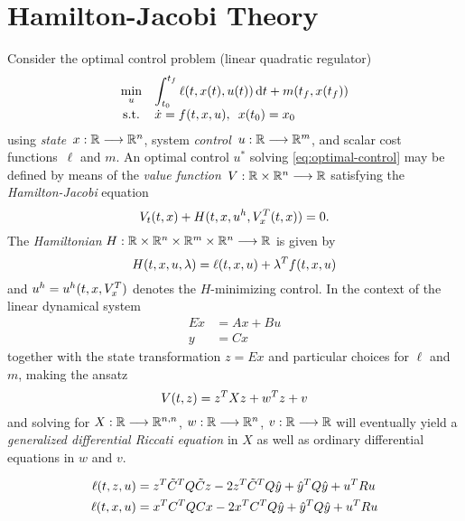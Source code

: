 \cite{DrWatson}

\section{Hamilton-Jacobi Theory}

Consider the optimal control problem
(linear quadratic regulator)
\begin{equation}
  \everymath{\displaystyle}
  \begin{array}{cl}
    \min_u & \int_{t_0}^{t_f} \ell(t, x(t), u(t)) \dt + m(t_f, x(t_f)) \\
    \text{s.t.} & \dot{x} = f(t,x,u), \enspace x(t_0) = x_0
  \end{array}
  \label{eq:optimal-control}
\end{equation}
using \emph{state}~$x:\mathbb{R}\longrightarrow\mathbb{R}^n$, system \emph{control}~$u:\mathbb{R}\longrightarrow\mathbb{R}^m$,
and scalar cost functions~$\ell$ and $m$.
An optimal control $u^*$ solving \eqref{eq:optimal-control} may be defined by means of the
\emph{value function}~$V:\mathbb{R}\times\mathbb{R}^n\longrightarrow\mathbb{R}$ satisfying the \emph{Hamilton-Jacobi} equation
\begin{equation}
  V_t(t,x) + H(t,x,u^h,V_x^T(t,x)) = 0.
  \label{eq:hamilton-jacobi}
\end{equation}
The \emph{Hamiltonian} $H:\mathbb{R}\times\mathbb{R}^n\times\mathbb{R}^m\times\mathbb{R}^n\longrightarrow\mathbb{R}$ is given by
\begin{equation}
  H(t,x,u,\lambda) = \ell(t,x,u) + \lambda^T f(t,x,u)
\end{equation}
and $u^h = u^h(t,x,V_x^T)$ denotes the $H$-minimizing control.
In the context of the linear dynamical system
\begin{equation}
  \begin{aligned}
    E\dot{x} &= Ax + Bu \\
    y &= Cx
  \end{aligned}
\end{equation}
together with the state transformation $z=Ex$ and particular choices for $\ell$ and $m$,
making the ansatz
\begin{equation}
  V(t,z) = z^T Xz + w^T z + v
\end{equation}
and solving for $X:\mathbb{R}\longrightarrow\mathbb{R}^{n,n}$, $w:\mathbb{R}\longrightarrow\mathbb{R}^n$, $v:\mathbb{R}\longrightarrow\mathbb{R}$ will eventually
yield a \emph{generalized differential Riccati equation} in $X$ as well as
ordinary differential equations in $w$ and $v$.
\cite{Locatelli2011}

\begin{align}
  \ell(t, z, u) &= z^T \tilde C^T Q \tilde C z - 2z^T \tilde C^T Q \hat y + \hat y^T Q \hat y + u^T R u \\
  \ell(t, x, u) &= x^T C^T Q C x - 2x^T C^T Q \hat y + \hat y^T Q \hat y + u^T R u
\end{align}
\cite[(3.12)]{Lang2017}

